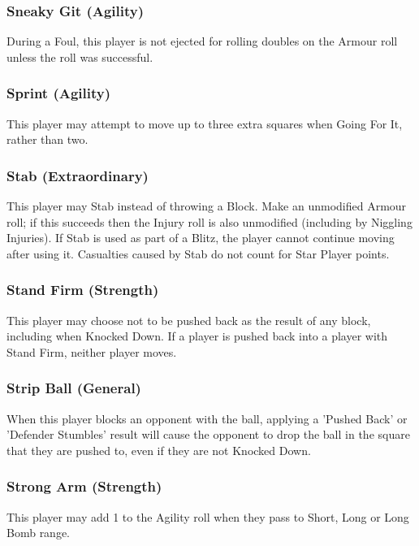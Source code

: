 \documentclass{article}
\begin{document}
\begin{multicols}{3}
\subsubsection{Sneaky Git (Agility)}
\par During a Foul, this player is not ejected for rolling doubles on the Armour roll unless the roll was successful.

\subsubsection{Sprint (Agility)}
\par This player may attempt to move up to three extra squares when Going For It, rather than two.

\subsubsection{Stab (Extraordinary)}
\par This player may Stab instead of throwing a Block. Make an unmodified Armour roll; if this succeeds then the Injury roll is also unmodified (including by Niggling Injuries). If Stab is used as part of a Blitz, the player cannot continue moving after using it. Casualties caused by Stab do not count for Star Player points.

\subsubsection{Stand Firm (Strength)}
\par This player may choose not to be pushed back as the result of any block, including when Knocked Down. If a player is pushed back into a player with Stand Firm, neither player moves.

\subsubsection{Strip Ball (General)}
\par When this player blocks an opponent with the ball, applying a 'Pushed Back' or 'Defender Stumbles' result will cause the opponent to drop the ball in the square that they are pushed to, even if they are not Knocked Down.

\subsubsection{Strong Arm (Strength)}
\par This player may add 1 to the Agility roll when they pass to Short, Long or Long Bomb range.


\end{multicols}
\end{document}
